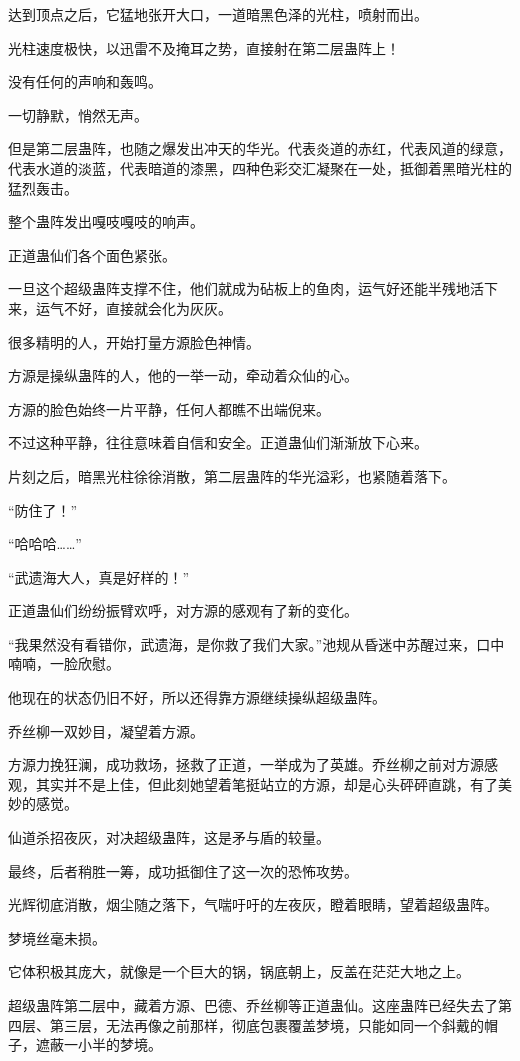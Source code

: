 \begin{this_body}
达到顶点之后，它猛地张开大口，一道暗黑色泽的光柱，喷射而出。

光柱速度极快，以迅雷不及掩耳之势，直接射在第二层蛊阵上！

没有任何的声响和轰鸣。

一切静默，悄然无声。

但是第二层蛊阵，也随之爆发出冲天的华光。代表炎道的赤红，代表风道的绿意，代表水道的淡蓝，代表暗道的漆黑，四种色彩交汇凝聚在一处，抵御着黑暗光柱的猛烈轰击。

整个蛊阵发出嘎吱嘎吱的响声。

正道蛊仙们各个面色紧张。

一旦这个超级蛊阵支撑不住，他们就成为砧板上的鱼肉，运气好还能半残地活下来，运气不好，直接就会化为灰灰。

很多精明的人，开始打量方源脸色神情。

方源是操纵蛊阵的人，他的一举一动，牵动着众仙的心。

方源的脸色始终一片平静，任何人都瞧不出端倪来。

不过这种平静，往往意味着自信和安全。正道蛊仙们渐渐放下心来。

片刻之后，暗黑光柱徐徐消散，第二层蛊阵的华光溢彩，也紧随着落下。

“防住了！”

“哈哈哈……”

“武遗海大人，真是好样的！”

正道蛊仙们纷纷振臂欢呼，对方源的感观有了新的变化。

“我果然没有看错你，武遗海，是你救了我们大家。”池规从昏迷中苏醒过来，口中喃喃，一脸欣慰。

他现在的状态仍旧不好，所以还得靠方源继续操纵超级蛊阵。

乔丝柳一双妙目，凝望着方源。

方源力挽狂澜，成功救场，拯救了正道，一举成为了英雄。乔丝柳之前对方源感观，其实并不是上佳，但此刻她望着笔挺站立的方源，却是心头砰砰直跳，有了美妙的感觉。

仙道杀招夜灰，对决超级蛊阵，这是矛与盾的较量。

最终，后者稍胜一筹，成功抵御住了这一次的恐怖攻势。

光辉彻底消散，烟尘随之落下，气喘吁吁的左夜灰，瞪着眼睛，望着超级蛊阵。

梦境丝毫未损。

它体积极其庞大，就像是一个巨大的锅，锅底朝上，反盖在茫茫大地之上。

超级蛊阵第二层中，藏着方源、巴德、乔丝柳等正道蛊仙。这座蛊阵已经失去了第四层、第三层，无法再像之前那样，彻底包裹覆盖梦境，只能如同一个斜戴的帽子，遮蔽一小半的梦境。


\end{this_body}
